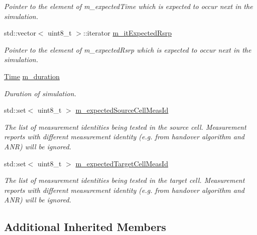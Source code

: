 \begin{DoxyCompactItemize}
\begin{DoxyCompactList}\small\item\em Pointer to the element of {\ttfamily m\+\_\+expected\+Time} which is expected to occur next in the simulation. \end{DoxyCompactList}\item 
std\+::vector$<$ uint8\+\_\+t $>$\+::iterator \hyperlink{classLteUeMeasurementsHandoverTestCase_a3536cc572e685490dd4e4fde364f39a3}{m\+\_\+it\+Expected\+Rsrp}
\begin{DoxyCompactList}\small\item\em Pointer to the element of {\ttfamily m\+\_\+expected\+Rsrp} which is expected to occur next in the simulation. \end{DoxyCompactList}\item 
\hyperlink{classns3_1_1Time}{Time} \hyperlink{classLteUeMeasurementsHandoverTestCase_a938131aebb85de0834fc408341950156}{m\+\_\+duration}
\begin{DoxyCompactList}\small\item\em Duration of simulation. \end{DoxyCompactList}\item 
std\+::set$<$ uint8\+\_\+t $>$ \hyperlink{classLteUeMeasurementsHandoverTestCase_aca431e1ebc93460a53628630a534c474}{m\+\_\+expected\+Source\+Cell\+Meas\+Id}
\begin{DoxyCompactList}\small\item\em The list of measurement identities being tested in the source cell. Measurement reports with different measurement identity (e.\+g. from handover algorithm and A\+NR) will be ignored. \end{DoxyCompactList}\item 
std\+::set$<$ uint8\+\_\+t $>$ \hyperlink{classLteUeMeasurementsHandoverTestCase_a63388a20a3de7adc15907242f6e4a8bf}{m\+\_\+expected\+Target\+Cell\+Meas\+Id}
\begin{DoxyCompactList}\small\item\em The list of measurement identities being tested in the target cell. Measurement reports with different measurement identity (e.\+g. from handover algorithm and A\+NR) will be ignored. \end{DoxyCompactList}\end{DoxyCompactItemize}
\subsection*{Additional Inherited Members}


